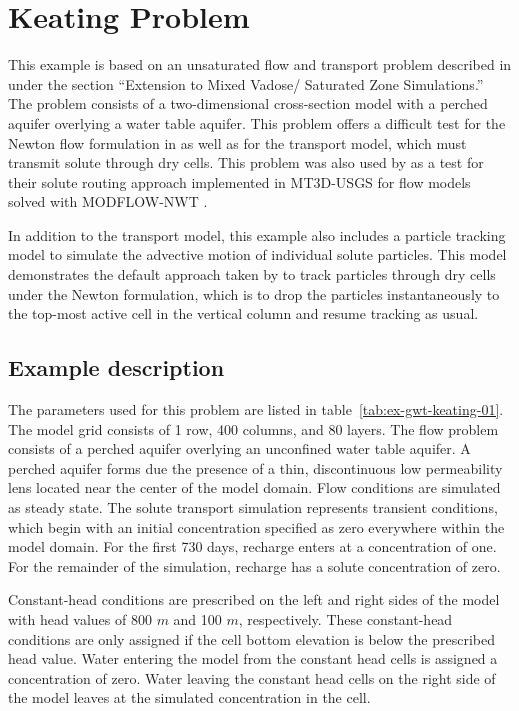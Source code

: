 \section{Keating Problem}

This example is based on an unsaturated flow and transport problem described in \cite{keating2009stable} under the section ``Extension to Mixed Vadose/ Saturated Zone Simulations.''  The problem consists of a two-dimensional cross-section model with a perched aquifer overlying a water table aquifer.  This problem offers a difficult test for the Newton flow formulation in \mf as well as for the transport model, which must transmit solute through dry cells.  This problem was also used by \cite{mt3dusgs} as a test for their solute routing approach implemented in MT3D-USGS for flow models solved with MODFLOW-NWT \citep{modflownwt}.

In addition to the transport model, this example also includes a particle tracking model to simulate the advective motion of individual solute particles.  This model demonstrates the default approach taken by \mf to track particles through dry cells under the Newton formulation, which is to drop the particles instantaneously to the top-most active cell in the vertical column and resume tracking as usual.

\subsection{Example description}

The parameters used for this problem are listed in table~\ref{tab:ex-gwt-keating-01}.  The model grid consists of 1 row, 400 columns, and 80 layers.  The flow problem consists of a perched aquifer overlying an unconfined water table aquifer.  A perched aquifer forms due the presence of a thin, discontinuous low permeability lens located near the center of the model domain.  Flow conditions are simulated as steady state.  The solute transport simulation represents transient conditions, which begin with an initial concentration specified as zero everywhere within the model domain.  For the first 730 days, recharge enters at a concentration of one.  For the remainder of the simulation, recharge has a solute concentration of zero.

Constant-head conditions are prescribed on the left and right sides of the model with head values of 800 $m$ and 100 $m$, respectively.  These constant-head conditions are only assigned if the cell bottom elevation is below the prescribed head value.  Water entering the model from the constant head cells is assigned a concentration of zero.  Water leaving the constant head cells on the right side of the model leaves at the simulated concentration in the cell.  

